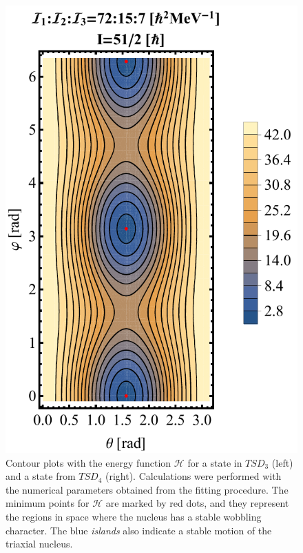 \documentclass[11pt]{article}
\begin{document}
\begin{figure}
\begin{minipage}{.5\textwidth}
\end{minipage}%
\begin{minipage}{.5\textwidth}
  \centering
 \includegraphics[scale=0.5]{figs/contour-tsd4.pdf}
\end{minipage}
\caption{Contour plots with the energy function $\mathcal{H}$ for a state in $TSD_3$ (left) and a state from $TSD_4$ (right). Calculations were performed with the numerical parameters obtained from the fitting procedure. The minimum points for $\mathcal{H}$ are marked by red dots, and they represent the regions in space where the nucleus has a stable wobbling character. The blue \emph{islands} also indicate a stable motion of the triaxial nucleus.}
    \label{contours-34}
\end{figure}
\end{document}
